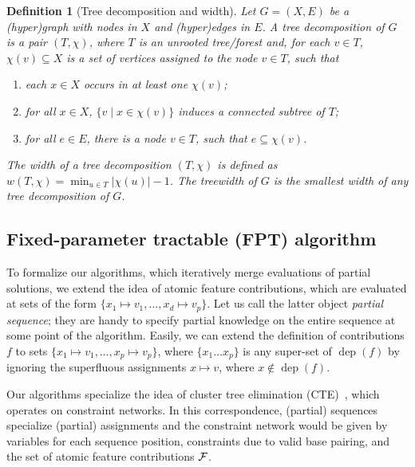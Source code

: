 \documentclass[twocolumn]{bmcart}%
\newtheorem{definition}[theorem]{Definition}
\newcommand{\dep}{\operatorname{dep}}
\newcommand{\width}{w}
\newcommand{\Def}[1]{\emph{#1}}
\newcommand{\citep}[1]{\cite{#1}}
\newcommand{\citet}[1]{\cite{#1}}
\begin{document}
\begin{definition}[Tree decomposition and width]
  \label{def:treedecomp}
  Let $G=(X, E)$ be a (hyper)graph with nodes in $X$ and (hyper)edges in $E$. A \Def{tree decomposition} of $G$ is
  a pair $(T,\chi)$, where $T$ is an unrooted tree/forest and, for
  each $v\in T$, $\chi(v)\subseteq X$ is a set of vertices assigned to
  the node $v\in T$, such that
\begin{enumerate}
\item each $x\in X$ occurs in at least one $\chi(v)$;
\item for all $x\in X$, $\{ v \mid x \in \chi(v) \}$ induces a connected subtree of $T$;
\item for all $e\in E$, there is a node $v\in T$, such that $e\subseteq\chi(v)$.
\end{enumerate}
The \Def{width} of a tree decomposition $(T,\chi)$ is defined as
$\width(T,\chi) = \min_{u\in T} |\chi(u)| - 1 $. The \Def{treewidth}
of $G$ is the smallest width of any tree decomposition of $G$.
\end{definition}

\subsection*{Fixed-parameter tractable (FPT) algorithm}
\label{sec:FPT}



To formalize our algorithms, which iteratively merge evaluations of partial solutions, we extend the idea of atomic feature contributions, which are evaluated at sets of the form $\{x_1\mapsto v_1, \dots, x_d\mapsto v_p\}$. Let us call the latter object \Def{partial sequence}; they are handy to specify partial knowledge on the entire sequence at some point of the algorithm. Easily, we can extend the definition of contributions $f$ to sets $\{x_1\mapsto v_1, \dots, x_p\mapsto v_p\}$, where $\{x_1\dots x_p\}$ is any super-set of $\dep(f)$ by ignoring the superfluous assignments $x\mapsto v$, where $x\not\in\dep(f)$. 

Our algorithms specialize the idea of cluster tree elimination (CTE)~\citep{Dechter2013}, which operates on constraint networks. In this correspondence, (partial) sequences specialize (partial) assignments and the constraint network would be given by variables for each sequence position, constraints due to valid base pairing, and the set of atomic feature contributions $\cal F$.
\end{document}
